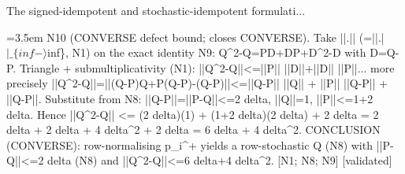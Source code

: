\documentclass{article}
\newcommand{\step}[1]{\par\noindent\hangindent=3.5em\hangafter=1%
  \makebox[3.5em][l]{\textbf{#1.}}}
\newcommand{\steptag}[1]{\hfill{\small\textsf{[#1]}}}
\begin{document}
\begin{proofbox}{The signed-idempotent and stochastic-idempotent formulati...}
\step{1.10} N10 (CONVERSE defect bound; closes CONVERSE). Take ||.|| (=||.|$|\_\{inf-\rangle$inf\}, N1) on the exact identity N9: Q\textasciicircum{}2-Q=PD+DP+D\textasciicircum{}2-D with D=Q-P. Triangle + submultiplicativity (N1): ||Q\textasciicircum{}2-Q||<=||P|| ||D||+||D|| ||P||... more precisely ||Q\textasciicircum{}2-Q||=||(Q-P)Q+P(Q-P)-(Q-P)||<=||Q-P|| ||Q|| + ||P|| ||Q-P|| + ||Q-P||. Substitute from N8: ||Q-P||=||P-Q||<=2 delta, ||Q||=1, ||P||<=1+2 delta. Hence ||Q\textasciicircum{}2-Q|| <= (2 delta)(1) + (1+2 delta)(2 delta) + 2 delta = 2 delta + 2 delta + 4 delta\textasciicircum{}2 + 2 delta = 6 delta + 4 delta\textasciicircum{}2. CONCLUSION (CONVERSE): row-normalising p\_i\textasciicircum{}+ yields a row-stochastic Q (N8) with ||P-Q||<=2 delta (N8) and ||Q\textasciicircum{}2-Q||<=6 delta+4 delta\textasciicircum{}2. [N1; N8; N9] \steptag{validated} \\[4pt]
\end{proofbox}
\end{document}
